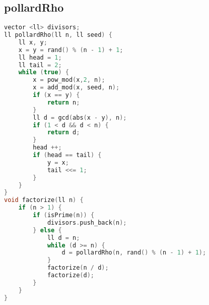 \subsection{pollardRho}
		\begin{lstlisting}[language=c++]
vector <ll> divisors;
ll pollardRho(ll n, ll seed) {
    ll x, y;
    x = y = rand() % (n - 1) + 1;
    ll head = 1;
    ll tail = 2;
    while (true) {
        x = pow_mod(x,2, n);
        x = add_mod(x, seed, n);
        if (x == y) {
            return n;
        }
        ll d = gcd(abs(x - y), n);
        if (1 < d && d < n) {
            return d;
        }
        head ++;
        if (head == tail) {
            y = x;
            tail <<= 1;
        }
    }
}
void factorize(ll n) {
    if (n > 1) {
        if (isPrime(n)) {
            divisors.push_back(n);
        } else {
            ll d = n;
            while (d >= n) {
                d = pollardRho(n, rand() % (n - 1) + 1);
            }
            factorize(n / d);
            factorize(d);
        }
    }
}
		\end{lstlisting}